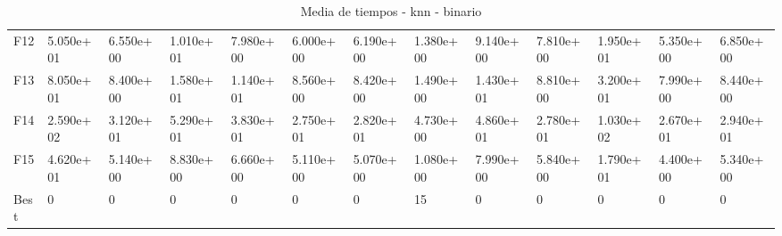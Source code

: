 \begin{table}
\begin{adjustbox}{width=\linewidth}
\begin{tabular}{lllllllllllll}
            F12  & 5.050e+01 & 6.550e+00 & 1.010e+01 & 7.980e+00 & 6.000e+00 & 6.190e+00 & 1.380e+00 & 9.140e+00 & 7.810e+00 & 1.950e+01 & 5.350e+00 & 6.850e+00 \\
            F13  & 8.050e+01 & 8.400e+00 & 1.580e+01 & 1.140e+01 & 8.560e+00 & 8.420e+00 & 1.490e+00 & 1.430e+01 & 8.810e+00 & 3.200e+01 & 7.990e+00 & 8.440e+00 \\
            F14  & 2.590e+02 & 3.120e+01 & 5.290e+01 & 3.830e+01 & 2.750e+01 & 2.820e+01 & 4.730e+00 & 4.860e+01 & 2.780e+01 & 1.030e+02 & 2.670e+01 & 2.940e+01 \\
            F15  & 4.620e+01 & 5.140e+00 & 8.830e+00 & 6.660e+00 & 5.110e+00 & 5.070e+00 & 1.080e+00 & 7.990e+00 & 5.840e+00 & 1.790e+01 & 4.400e+00 & 5.340e+00 \\
            Best & 0         & 0         & 0         & 0         & 0         & 0         & 15        & 0         & 0         & 0         & 0         & 0         \\
            \bottomrule
        \end{tabular}
    \end{adjustbox}
    \caption{Media de tiempos - knn - binario}
    \label{tab:mean_time_knn_bin}
\end{table}

